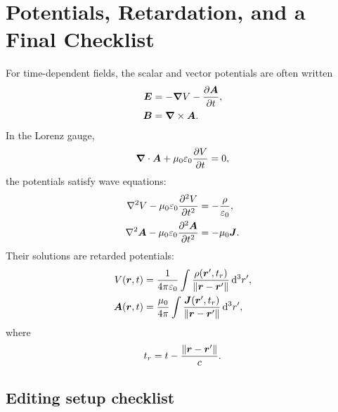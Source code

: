 \newpage

\section{Potentials, Retardation, and a Final Checklist}
\label{sec:retarded}

For time-dependent fields, the scalar and vector potentials are often written
\begin{align}
  \bm{E}
  &=
  -\bm{\nabla} V
  -
  \frac{\partial\bm{A}}{\partial t},
  \label{eq:e-from-potentials}
  \\
  \bm{B}
  &=
  \bm{\nabla} \times\bm{A}.
  \label{eq:b-from-potentials}
\end{align}
In the Lorenz gauge,
\begin{equation}
  \bm{\nabla} \cdot\bm{A}
  +
  \mu_0\varepsilon_0
  \frac{\partial V}{\partial t}
  =
  0,
  \label{eq:lorenz-gauge}
\end{equation}
the potentials satisfy wave equations:
\begin{align}
  \nabla^2 V
  -
  \mu_0\varepsilon_0
  \frac{\partial^2 V}{\partial t^2}
  &=
  -
  \frac{\rho}{\varepsilon_0},
  \\
  \nabla^2 \bm{A}
  -
  \mu_0\varepsilon_0
  \frac{\partial^2 \bm{A}}{\partial t^2}
  &=
  -
  \mu_0 \bm{J}.
\end{align}
Their solutions are retarded potentials:
\begin{align}
  V(\bm{r},t)
  &=
  \frac{1}{4\pi\varepsilon_0}
  \int
  \frac{\rho(\bm{r}', t_r)}
       {\lVert \bm{r}-\bm{r}'\rVert}
  \mathop{}\!\mathrm{d}^3r',
  \\
  \bm{A}(\bm{r},t)
  &=
  \frac{\mu_0}{4\pi}
  \int
  \frac{\bm{J}(\bm{r}', t_r)}
       {\lVert \bm{r}-\bm{r}'\rVert}
  \mathop{}\!\mathrm{d}^3r',
\end{align}
where
\begin{equation}
  t_r
  =
  t
  -
  \frac{\lVert \bm{r}-\bm{r}'\rVert}{c}.
  \label{eq:retarded-time}
\end{equation}

\subsection{Editing setup checklist}

